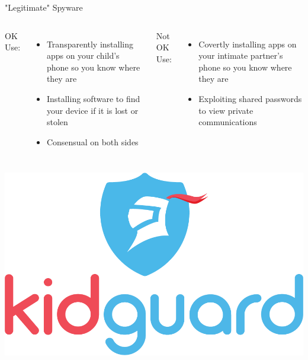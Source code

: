 \documentclass[nobackground,dvipsnames,table,aspectratio=169]{beamer}
\begin{document}
\begin{frame}{"Legitimate" Spyware}
    \begin{columns}
            OK Use:
            \begin{itemize}
                \item Transparently installing apps on your child’s phone so you know where they are
                \item Installing software to find your device if it is lost or stolen
                \item Consensual on both sides
            \end{itemize}
            Not OK Use:
            \begin{itemize}
                \item Covertly installing apps on your intimate partner’s phone so you know where they are
                \item Exploiting shared passwords to view private communications
            \end{itemize}
    \end{columns}
    \vspace{0.1\textheight}
    \begin{columns}
            \includegraphics[width=\textwidth]{kidguard}

\end{columns}
\end{frame}
\end{document}
